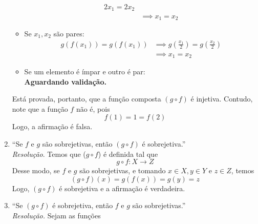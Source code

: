 \begin{enumerate}
\begin{itemize}
\begin{align*}
            2x_1 = 2x_2 \\ & \implies
            x_1 = x_2
        \end{align*}    
        \item Se $x_1, x_2$ são pares:
        \begin{align*}
            g(f(x_1)) = g(f(x_1)) & \implies
            g(\frac{x_1}{2}) = g(\frac{x_2}{2}) \\ & \implies 
            x_1 = x_2
        \end{align*}
        \item Se um elemento é ímpar e outro é par: \\
        \textbf{Aguardando validação.}
    \end{itemize}
    Está provada, portanto, que a função composta $(g \circ f)$ é injetiva. Contudo, note que a função $f$ não é, pois
    \begin{displaymath}
        f(1) = 1 = f(2)
    \end{displaymath}
    Logo, a afirmação é falsa.
    \item \enquote{Se $f$ e $g$ são sobrejetivas, então $(g\circ f)$ é sobrejetiva.}
    \\ \emph{Resolução}. Temos que ($g \circ f$) é definida tal que
    \begin{displaymath}
        g \circ f: X \rightarrow Z 
    \end{displaymath}
    Desse modo, se $f$ e $g$ são sobrejetivas, e tomando $x \in X, y \in Y$ e $z \in Z$, temos
    \begin{displaymath}
        (g\circ f)(x) = g(f(x)) = g(y) = z
    \end{displaymath}
    Logo, $(g \circ f)$ é sobrejetiva e a afirmação é verdadeira.
    \item \enquote{Se $(g \circ f)$ é sobrejetiva, então $f \text{ e } g$ são sobrejetivas.}
    \\ \emph{Resolução.} Sejam as funções
    \begin{align*}

\end{align*}
\end{enumerate}
